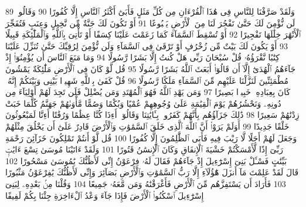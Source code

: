 {\tiny\colorbox{cl_aya}{89}} وَلَقَدْ صَرَّفْنَا لِلنَّاسِ فِى هَٰذَا ٱلْقُرْءَانِ مِن كُلِّ مَثَلٍ فَأَبَىٰٓ أَكْثَرُ ٱلنَّاسِ إِلَّا كُفُورًا
{\tiny\colorbox{cl_aya}{90}} وَقَالُوا۟ لَن نُّؤْمِنَ لَكَ حَتَّىٰ تَفْجُرَ لَنَا مِنَ ٱلْأَرْضِ يَنۢبُوعًا
{\tiny\colorbox{cl_aya}{91}} أَوْ تَكُونَ لَكَ جَنَّةٌ مِّن نَّخِيلٍ وَعِنَبٍ فَتُفَجِّرَ ٱلْأَنْهَٰرَ خِلَٰلَهَا تَفْجِيرًا
{\tiny\colorbox{cl_aya}{92}} أَوْ تُسْقِطَ ٱلسَّمَآءَ كَمَا زَعَمْتَ عَلَيْنَا كِسَفًا أَوْ تَأْتِىَ بِٱللَّهِ وَٱلْمَلَٰٓئِكَةِ قَبِيلًا
{\tiny\colorbox{cl_aya}{93}} أَوْ يَكُونَ لَكَ بَيْتٌ مِّن زُخْرُفٍ أَوْ تَرْقَىٰ فِى ٱلسَّمَآءِ وَلَن نُّؤْمِنَ لِرُقِيِّكَ حَتَّىٰ تُنَزِّلَ عَلَيْنَا كِتَٰبًا نَّقْرَؤُهُۥ قُلْ سُبْحَانَ رَبِّى هَلْ كُنتُ إِلَّا بَشَرًا رَّسُولًا
{\tiny\colorbox{cl_aya}{94}} وَمَا مَنَعَ ٱلنَّاسَ أَن يُؤْمِنُوٓا۟ إِذْ جَآءَهُمُ ٱلْهُدَىٰٓ إِلَّآ أَن قَالُوٓا۟ أَبَعَثَ ٱللَّهُ بَشَرًا رَّسُولًا
{\tiny\colorbox{cl_aya}{95}} قُل لَّوْ كَانَ فِى ٱلْأَرْضِ مَلَٰٓئِكَةٌ يَمْشُونَ مُطْمَئِنِّينَ لَنَزَّلْنَا عَلَيْهِم مِّنَ ٱلسَّمَآءِ مَلَكًا رَّسُولًا
{\tiny\colorbox{cl_aya}{96}} قُلْ كَفَىٰ بِٱللَّهِ شَهِيدًۢا بَيْنِى وَبَيْنَكُمْ إِنَّهُۥ كَانَ بِعِبَادِهِۦ خَبِيرًۢا بَصِيرًا
{\tiny\colorbox{cl_aya}{97}} وَمَن يَهْدِ ٱللَّهُ فَهُوَ ٱلْمُهْتَدِ وَمَن يُضْلِلْ فَلَن تَجِدَ لَهُمْ أَوْلِيَآءَ مِن دُونِهِۦ وَنَحْشُرُهُمْ يَوْمَ ٱلْقِيَٰمَةِ عَلَىٰ وُجُوهِهِمْ عُمْيًا وَبُكْمًا وَصُمًّا مَّأْوَىٰهُمْ جَهَنَّمُ كُلَّمَا خَبَتْ زِدْنَٰهُمْ سَعِيرًا
{\tiny\colorbox{cl_aya}{98}} ذَٰلِكَ جَزَآؤُهُم بِأَنَّهُمْ كَفَرُوا۟ بِـَٔايَٰتِنَا وَقَالُوٓا۟ أَءِذَا كُنَّا عِظَٰمًا وَرُفَٰتًا أَءِنَّا لَمَبْعُوثُونَ خَلْقًا جَدِيدًا
{\tiny\colorbox{cl_aya}{99}} أَوَلَمْ يَرَوْا۟ أَنَّ ٱللَّهَ ٱلَّذِى خَلَقَ ٱلسَّمَٰوَٰتِ وَٱلْأَرْضَ قَادِرٌ عَلَىٰٓ أَن يَخْلُقَ مِثْلَهُمْ وَجَعَلَ لَهُمْ أَجَلًا لَّا رَيْبَ فِيهِ فَأَبَى ٱلظَّٰلِمُونَ إِلَّا كُفُورًا
{\tiny\colorbox{cl_aya}{100}} قُل لَّوْ أَنتُمْ تَمْلِكُونَ خَزَآئِنَ رَحْمَةِ رَبِّىٓ إِذًا لَّأَمْسَكْتُمْ خَشْيَةَ ٱلْإِنفَاقِ وَكَانَ ٱلْإِنسَٰنُ قَتُورًا
{\tiny\colorbox{cl_aya}{101}} وَلَقَدْ ءَاتَيْنَا مُوسَىٰ تِسْعَ ءَايَٰتٍۭ بَيِّنَٰتٍ فَسْـَٔلْ بَنِىٓ إِسْرَٰٓءِيلَ إِذْ جَآءَهُمْ فَقَالَ لَهُۥ فِرْعَوْنُ إِنِّى لَأَظُنُّكَ يَٰمُوسَىٰ مَسْحُورًا
{\tiny\colorbox{cl_aya}{102}} قَالَ لَقَدْ عَلِمْتَ مَآ أَنزَلَ هَٰٓؤُلَآءِ إِلَّا رَبُّ ٱلسَّمَٰوَٰتِ وَٱلْأَرْضِ بَصَآئِرَ وَإِنِّى لَأَظُنُّكَ يَٰفِرْعَوْنُ مَثْبُورًا
{\tiny\colorbox{cl_aya}{103}} فَأَرَادَ أَن يَسْتَفِزَّهُم مِّنَ ٱلْأَرْضِ فَأَغْرَقْنَٰهُ وَمَن مَّعَهُۥ جَمِيعًا
{\tiny\colorbox{cl_aya}{104}} وَقُلْنَا مِنۢ بَعْدِهِۦ لِبَنِىٓ إِسْرَٰٓءِيلَ ٱسْكُنُوا۟ ٱلْأَرْضَ فَإِذَا جَآءَ وَعْدُ ٱلْءَاخِرَةِ جِئْنَا بِكُمْ لَفِيفًا
